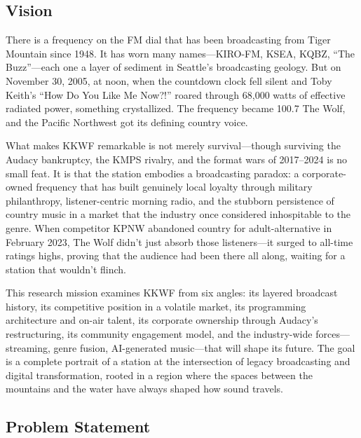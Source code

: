 \documentclass[11pt,letterpaper]{article}
\begin{document}
\subsection{Vision}

There is a frequency on the FM dial that has been broadcasting from Tiger Mountain since 1948. It has worn many names---KIRO-FM, KSEA, KQBZ, ``The Buzz''---each one a layer of sediment in Seattle's broadcasting geology. But on November 30, 2005, at noon, when the countdown clock fell silent and Toby Keith's ``How Do You Like Me Now?!'' roared through 68,000 watts of effective radiated power, something crystallized. The frequency became 100.7 The Wolf, and the Pacific Northwest got its defining country voice.

What makes KKWF remarkable is not merely survival---though surviving the Audacy bankruptcy, the KMPS rivalry, and the format wars of 2017--2024 is no small feat. It is that the station embodies a broadcasting paradox: a corporate-owned frequency that has built genuinely local loyalty through military philanthropy, listener-centric morning radio, and the stubborn persistence of country music in a market that the industry once considered inhospitable to the genre. When competitor KPNW abandoned country for adult-alternative in February 2023, The Wolf didn't just absorb those listeners---it surged to all-time ratings highs, proving that the audience had been there all along, waiting for a station that wouldn't flinch.

This research mission examines KKWF from six angles: its layered broadcast history, its competitive position in a volatile market, its programming architecture and on-air talent, its corporate ownership through Audacy's restructuring, its community engagement model, and the industry-wide forces---streaming, genre fusion, AI-generated music---that will shape its future. The goal is a complete portrait of a station at the intersection of legacy broadcasting and digital transformation, rooted in a region where the spaces between the mountains and the water have always shaped how sound travels.

\subsection{Problem Statement}
\end{document}

